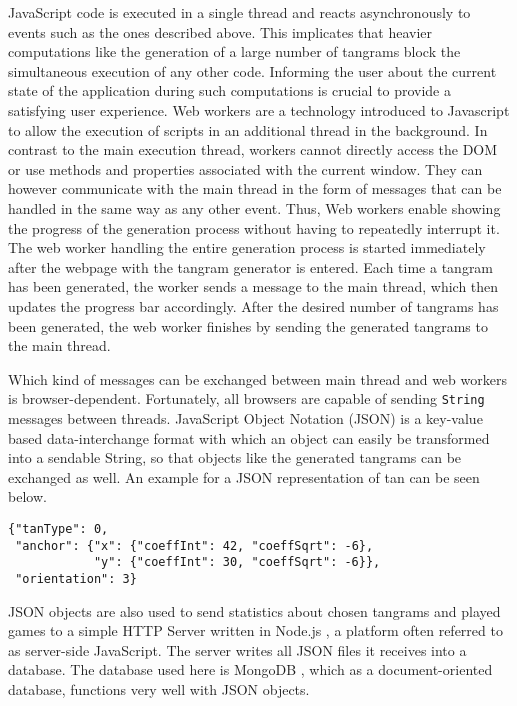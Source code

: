 JavaScript code is executed in a single thread and reacts asynchronously to events such as the ones described above. This implicates that heavier computations like the generation of a large number of tangrams block the simultaneous execution of any other code. Informing the user about the current state of the application during such computations is crucial to provide a satisfying user experience. Web workers \cite{w3c12} are a technology introduced to Javascript to allow the execution of scripts in an additional thread in the background. In contrast to the main execution thread, workers cannot directly access the DOM or use methods and properties associated with the current window. They can however communicate with the main thread in the form of messages that can be handled in the same way as any other event. Thus, Web workers enable showing the progress of the generation process without having to repeatedly interrupt it. The web worker handling the entire generation process is started immediately after the webpage with the tangram generator is entered. Each time a tangram has been generated, the worker sends a message to the main thread, which then updates the progress bar accordingly. After the desired number of tangrams has been generated, the web worker finishes by sending the generated tangrams to the main thread. 

Which kind of messages can be exchanged between main thread and web workers is browser-dependent. Fortunately, all browsers are capable of sending \verb|String| messages between threads. JavaScript Object Notation (JSON) is a key-value based data-interchange format with which an object can easily be transformed into a sendable String, so that objects like the generated tangrams can be exchanged as well. An example for a JSON representation of tan can be seen below.

\begin{lstlisting}
{"tanType": 0,
 "anchor": {"x": {"coeffInt": 42, "coeffSqrt": -6}, 
            "y": {"coeffInt": 30, "coeffSqrt": -6}},
 "orientation": 3}
\end{lstlisting}

JSON objects are also used to send statistics about chosen tangrams and played games to a simple HTTP Server written in Node.js \cite{node}, a platform often referred to as server-side JavaScript. The server writes all JSON files it receives into a database. The database used here is MongoDB \cite{mongo}, which as a document-oriented database, functions very well with JSON objects.